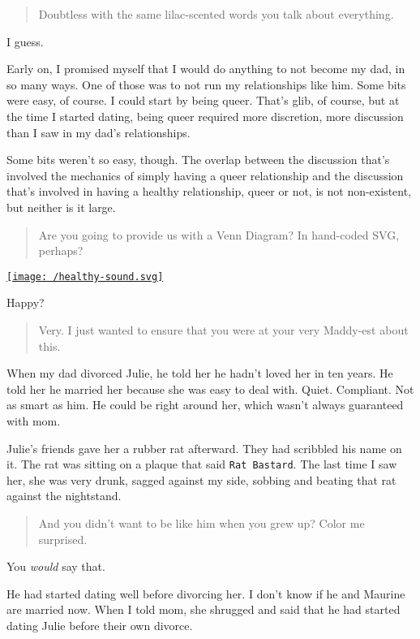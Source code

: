 \begin{quote}
Doubtless with the same lilac-scented words you talk about everything.
\end{quote}

I guess.

Early on, I promised myself that I would do anything to not become my dad, in so many ways. One of those was to not run my relationships like him. Some bits were easy, of course. I could start by being queer. That's glib, of course, but at the time I started dating, being queer required more discretion, more discussion than I saw in my dad's relationships.

Some bits weren't so easy, though. The overlap between the discussion that's involved the mechanics of simply having a queer relationship and the discussion that's involved in having a healthy relationship, queer or not, is not non-existent, but neither is it large.

\begin{quote}
Are you going to provide us with a Venn Diagram? In hand-coded SVG, perhaps?
\end{quote}

\href{/healthy-sound.svg}{\texttt{[image: /healthy-sound.svg]}}

Happy?

\begin{quote}
Very. I just wanted to ensure that you were at your very Maddy-est about this.
\end{quote}

When my dad divorced Julie, he told her he hadn't loved her in ten years. He told her he married her because she was easy to deal with. Quiet. Compliant. Not as smart as him. He could be right around her, which wasn't always guaranteed with mom.

Julie's friends gave her a rubber rat afterward. They had scribbled his name on it. The rat was sitting on a plaque that said \texttt{Rat\ Bastard}. The last time I saw her, she was very drunk, sagged against my side, sobbing and beating that rat against the nightstand.

\begin{quote}
And you didn't want to be like him when you grew up? Color me surprised.
\end{quote}

You \emph{would} say that.

He had started dating well before divorcing her. I don't know if he and Maurine are married now. When I told mom, she shrugged and said that he had started dating Julie before their own divorce.

